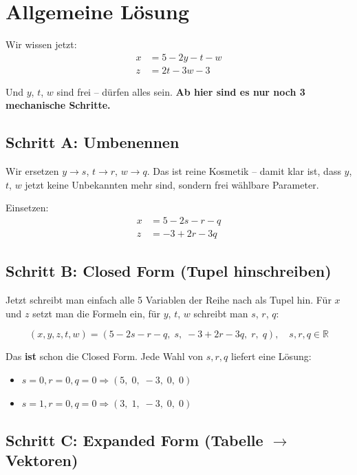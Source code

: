 \documentclass[a4paper,12pt]{article}
\begin{document}
\newpage
\section*{Allgemeine Lösung}

Wir wissen jetzt:
\begin{align*}
x &= 5 - 2y - t - w \\
z &= 2t - 3w - 3
\end{align*}

Und $y$, $t$, $w$ sind frei -- dürfen alles sein.
\textbf{Ab hier sind es nur noch 3 mechanische Schritte.}

\subsection*{Schritt A: Umbenennen}

Wir ersetzen $y \to s$, $t \to r$, $w \to q$.
Das ist reine Kosmetik -- damit klar ist, dass $y$, $t$, $w$ jetzt keine
Unbekannten mehr sind, sondern frei wählbare Parameter.

Einsetzen:
\begin{align*}
x &= 5 - 2s - r - q \\
z &= -3 + 2r - 3q
\end{align*}

\subsection*{Schritt B: Closed Form (Tupel hinschreiben)}

Jetzt schreibt man einfach alle 5 Variablen der Reihe nach als Tupel hin.
Für $x$ und $z$ setzt man die Formeln ein, für $y$, $t$, $w$ schreibt man $s$, $r$, $q$:

\[
\boxed{(x,y,z,t,w) = (5 - 2s - r - q,\; s,\; -3 + 2r - 3q,\; r,\; q), \quad s, r, q \in \mathbb{R}}
\]

Das \textbf{ist} schon die Closed Form. Jede Wahl von $s, r, q$ liefert eine Lösung:
\begin{itemize}
\item $s{=}0, r{=}0, q{=}0 \Rightarrow (5,\; 0,\; {-}3,\; 0,\; 0)$
\item $s{=}1, r{=}0, q{=}0 \Rightarrow (3,\; 1,\; {-}3,\; 0,\; 0)$
\end{itemize}

\subsection*{Schritt C: Expanded Form (Tabelle $\to$ Vektoren)}
\end{document}
